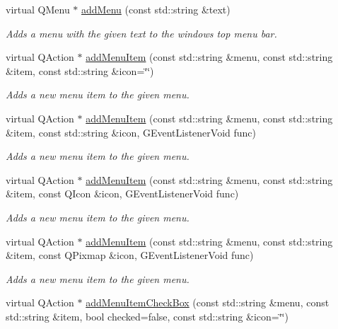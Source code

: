 \begin{DoxyCompactItemize}
virtual Q\+Menu $\ast$ \mbox{\hyperlink{classGWindow_afffea482963d5566e97ccccb1f94a4e2}{add\+Menu}} (const std\+::string \&text)
\begin{DoxyCompactList}\small\item\em Adds a menu with the given text to the window\textquotesingle{}s top menu bar. \end{DoxyCompactList}\item 
virtual Q\+Action $\ast$ \mbox{\hyperlink{classGWindow_a43efd24277d68e749443cb7c36b65f4b}{add\+Menu\+Item}} (const std\+::string \&menu, const std\+::string \&item, const std\+::string \&icon=\char`\"{}\char`\"{})
\begin{DoxyCompactList}\small\item\em Adds a new menu item to the given menu. \end{DoxyCompactList}\item 
virtual Q\+Action $\ast$ \mbox{\hyperlink{classGWindow_ad57e2955efbfb5a0cccc981332945c8e}{add\+Menu\+Item}} (const std\+::string \&menu, const std\+::string \&item, const std\+::string \&icon, G\+Event\+Listener\+Void func)
\begin{DoxyCompactList}\small\item\em Adds a new menu item to the given menu. \end{DoxyCompactList}\item 
virtual Q\+Action $\ast$ \mbox{\hyperlink{classGWindow_a9c1d62659ac23b6752a59dc657c5140c}{add\+Menu\+Item}} (const std\+::string \&menu, const std\+::string \&item, const Q\+Icon \&icon, G\+Event\+Listener\+Void func)
\begin{DoxyCompactList}\small\item\em Adds a new menu item to the given menu. \end{DoxyCompactList}\item 
virtual Q\+Action $\ast$ \mbox{\hyperlink{classGWindow_a8452af11e9c36ac44dbdc4332095871e}{add\+Menu\+Item}} (const std\+::string \&menu, const std\+::string \&item, const Q\+Pixmap \&icon, G\+Event\+Listener\+Void func)
\begin{DoxyCompactList}\small\item\em Adds a new menu item to the given menu. \end{DoxyCompactList}\item 
virtual Q\+Action $\ast$ \mbox{\hyperlink{classGWindow_ae363de5d4c0d5848a5936563b12c3288}{add\+Menu\+Item\+Check\+Box}} (const std\+::string \&menu, const std\+::string \&item, bool checked=false, const std\+::string \&icon=\char`\"{}\char`\"{})

\end{DoxyCompactItemize}
